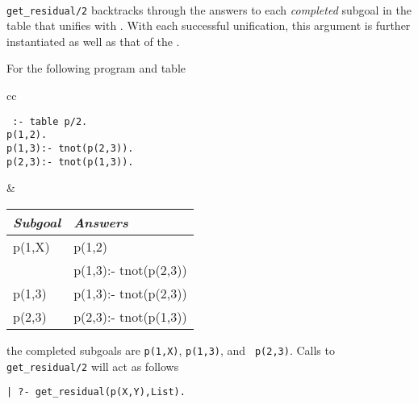 \begin{description}
\begin{minipage}{6.1in}
\end{minipage} \\


%
%
{\tt get\_residual/2} backtracks through the answers to each
\emph{completed} subgoal in the table that unifies with
.  With each successful unification, this argument is
further instantiated as well as that of the .

\begin{example} \label{ex:residual-program}
For the following program and table
     \begin{center}
     \begin{tabular}{cc}
     \begin{minipage}{2.1in}
     {\tt
          :- table p/2. \\
          p(1,2). \\
          p(1,3):- tnot(p(2,3)). \\
          p(2,3):- tnot(p(1,3)). 
     }
     \end{minipage}
     &
     \begin{tabular}{||l|l||}   \hline
     {\em Subgoal}                 & {\em Answers} \\ \hline \hline
     p(1,X)                     & p(1,2) \\ 
                                & p(1,3):- tnot(p(2,3)) \\ \hline
     p(1,3)                     & p(1,3):- tnot(p(2,3)) \\ \hline
     p(2,3)                     & p(2,3):- tnot(p(1,3)) \\ \hline
     \end{tabular}
     \end{tabular}
     \end{center}
the completed subgoals are {\tt p(1,X)}, {\tt p(1,3)}, and {\tt
p(2,3)}.  Calls to {\tt get\_residual/2} will act as follows
%
\begin{center}
\begin{small}
\begin{verbatim} 
| ?- get_residual(p(X,Y),List).


\end{verbatim}
\end{small}
\end{center}
\end{example}
\end{description}
